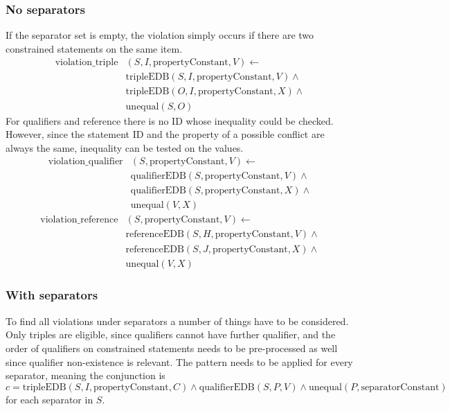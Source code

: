 \documentclass[hyperref,bachelorofscience,fleqn]{cgvpub}
\begin{document}
\subsubsection{No separators}
If the separator set is empty, the violation simply occurs if there are two constrained statements on the same item. 
\begin{equation}\label{eq_no_separators_triple}
\begin{split}
\text{violation\_triple}&(S, I, \text{propertyConstant}, V) \leftarrow \\
&\text{tripleEDB}(S, I, \text{propertyConstant}, V) \wedge \\
&\text{tripleEDB}(O, I, \text{propertyConstant}, X) \wedge \\
&\text{unequal}(S, O)
\end{split}
\end{equation}
For qualifiers and reference there is no ID whose inequality could be checked. However, since the statement ID and the property of a possible conflict are always the same, inequality can be tested on the values.
\begin{equation*}
\begin{split}
\text{violation\_qualifier}&(S, \text{propertyConstant}, V) \leftarrow \\
&\text{qualifierEDB}(S, \text{propertyConstant}, V) \wedge \\
&\text{qualifierEDB}(S, \text{propertyConstant}, X) \wedge \\
&\text{unequal}(V, X)
\end{split}
\end{equation*}
\begin{equation*}
\begin{split}
\text{violation\_reference}&(S, \text{propertyConstant}, V) \leftarrow \\
&\text{referenceEDB}(S, H, \text{propertyConstant}, V) \wedge \\
&\text{referenceEDB}(S, J, \text{propertyConstant}, X) \wedge \\
&\text{unequal}(V, X)
\end{split}
\end{equation*}

\subsubsection{With separators}\label{subsubsec_with_separators}
To find all violations under separators a number of things have to be considered. Only triples are eligible, since qualifiers cannot have further qualifier, and the order of qualifiers on constrained statements needs to be pre-processed as well since qualifier non-existence is relevant. The pattern needs to be applied for every separator, meaning the conjunction is
\begin{equation*}
c = \text{tripleEDB}(S, I, \text{propertyConstant}, C) \wedge \text{qualifierEDB}(S, P, V) \wedge \text{unequal}(P, \text{separatorConstant})
\end{equation*}
for each separator in \(S\).\\
\end{document}
